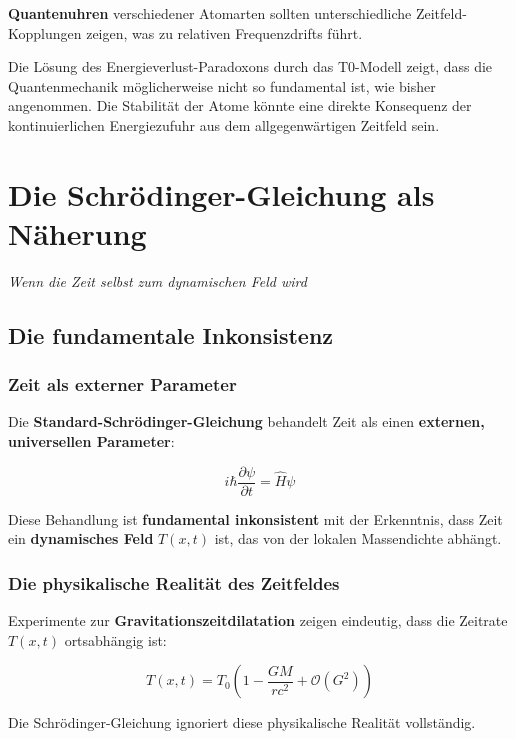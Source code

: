 \documentclass[12pt,a4paper]{report}
\begin{document}
\textbf{Quantenuhren} verschiedener Atomarten sollten unterschiedliche Zeitfeld-Kopplungen zeigen, was zu relativen Frequenzdrifts führt.

Die Lösung des Energieverlust-Paradoxons durch das T0-Modell zeigt, dass die Quantenmechanik möglicherweise nicht so fundamental ist, wie bisher angenommen. Die Stabilität der Atome könnte eine direkte Konsequenz der kontinuierlichen Energiezufuhr aus dem allgegenwärtigen Zeitfeld sein.
% 
	\chapter{Die Schrödinger-Gleichung als Näherung}
\textit{Wenn die Zeit selbst zum dynamischen Feld wird}

\section{Die fundamentale Inkonsistenz}

\subsection{Zeit als externer Parameter}

Die \textbf{Standard-Schrödinger-Gleichung} behandelt Zeit als einen \textbf{externen, universellen Parameter}:

\begin{equation}
	i\hbar\frac{\partial\psi}{\partial t} = \hat{H}\psi
\end{equation}

Diese Behandlung ist \textbf{fundamental inkonsistent} mit der Erkenntnis, dass Zeit ein \textbf{dynamisches Feld} $T(x,t)$ ist, das von der lokalen Massendichte abhängt.

\subsection{Die physikalische Realität des Zeitfeldes}

Experimente zur \textbf{Gravitationszeitdilatation} zeigen eindeutig, dass die Zeitrate $T(x,t)$ ortsabhängig ist:

\begin{equation}
	T(x,t) = T_0\left(1 - \frac{GM}{rc^2} + \mathcal{O}(G^2)\right)
\end{equation}

Die Schrödinger-Gleichung ignoriert diese physikalische Realität vollständig.
\end{document}
